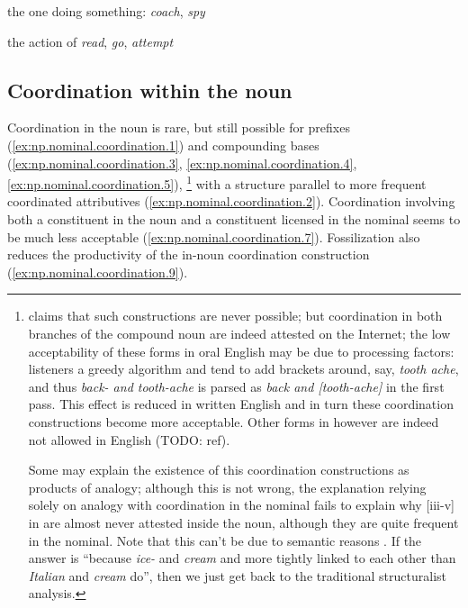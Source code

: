 \documentclass[UTF8, a4paper, oneside, scheme=plain, 12pt]{ctexbook}
\newcommand*{\citepage}[1]{p.~{#1}}
\newcommand{\form}[1]{\emph{#1}}
\begin{document}
the one doing something: \form{coach}, \form{spy}

the action of \form{read}, \form{go}, \form{attempt}

\subsection{Coordination within the noun}\label{sec:np.noun.coordination}

Coordination in the noun is rare, but still possible 
for prefixes (\ref{ex:np.nominal.coordination.1})
and compounding bases
(\ref{ex:np.nominal.coordination.3},
\ref{ex:np.nominal.coordination.4},
\ref{ex:np.nominal.coordination.5}),%
\footnote{
    \citet[\citepage{449}, {[24]}; \citepage{450}, {[27]}]{cgel} claims that 
    such constructions are never possible; 
    but coordination in both branches of the compound noun 
    are indeed attested on the Internet; 
    the low acceptability of these forms in oral English 
    may be due to processing factors: 
    listeners a greedy algorithm and tend to add brackets 
    around, say, \form{tooth ache}, 
    and thus \form{back- and tooth-ache} is parsed as 
    \form{back and [tooth-ache]} in the first pass.
    This effect is reduced in written English 
    and in turn these coordination constructions become more acceptable. 
    Other forms in \citet[\citepage{449}, {[24]}]{cgel}
    however are indeed not allowed in English (TODO: ref).

    Some may explain the existence of this coordination constructions 
    as products of analogy; 
    although this is not wrong, 
    the explanation relying solely on analogy with coordination in the nominal
    fails to explain why [iii-v] in \citet[\citepage{449}, {[24]}]{cgel} 
    are almost never attested inside the noun, 
    although they are quite frequent in the nominal. 
    Note that this can't be due to semantic reasons 
    \citep[\citepage{450}]{cgel}. 
    If the answer is ``because \form{ice-} and \form{cream} 
    and more tightly linked to each other than 
    \form{Italian} and \form{cream} do'', 
    then we just get back to the traditional structuralist analysis.
}
with a structure parallel to 
more frequent coordinated attributives 
(\ref{ex:np.nominal.coordination.2}). 
Coordination involving both a constituent in the noun 
and a constituent licensed in the nominal seems to be much less acceptable 
(\ref{ex:np.nominal.coordination.7}).
Fossilization also reduces the productivity of 
the in-noun coordination construction (\ref{ex:np.nominal.coordination.9}).
\end{document}
